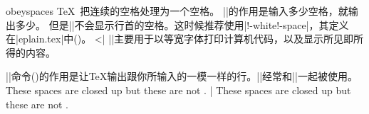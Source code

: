 \enddesc
%
%

\begindesc
\cts obeyspaces {}
\explain
\TeX\ 把连续的空格处理为一个空格。
|\obeyspaces|的作用是输入多少空格，就输出多少。
但是|\obeyspaces|不会显示行首的空格。这时候推荐使用|\obey!-white!-space|，其定义在|eplain.tex|中()。
^^|\obeywhitespace|
|\obeyspaces|主要用于以等宽字体打印计算机代码，以及显示所见即所得的内容。


|\obeylines|命令(\xref{\obeylines})的作用是让\TeX{}输出跟你所输入的一模一样的行。|\obeylines|经常和|\obeyspaces|一起被使用。
\example
These     spaces    are    closed   up
{\obeyspaces but   these  are     not   }.
|
\produces
These     spaces    are    closed   up
{\obeyspaces but   these  are     not   }.
\endexample
\enddesc

